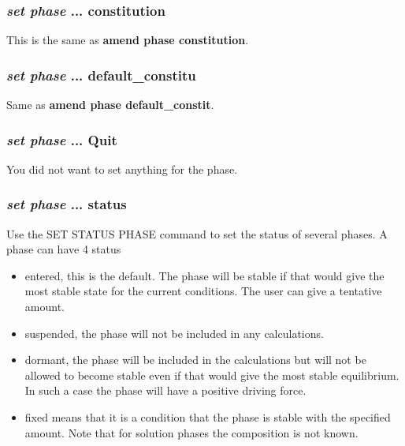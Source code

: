 \documentclass[12pt]{article}
\begin{document}
\subsubsection{{\em set phase} ... constitution}

This is the same as {\bf amend phase constitution}.

\subsubsection{{\em set phase} ... default\_constitu}

Same as {\bf amend phase default\_constit}.

\subsubsection{{\em set phase} ... Quit}

You did not want to set anything for the phase.

\subsubsection{{\em set phase} ... status}

Use the SET STATUS PHASE command to set the status of several phases.
A phase can have 4 status

\begin{itemize}
\item entered, this is the default.  The phase will be stable if that
would give the most stable state for the current conditions.  The user
can give a tentative amount.
\item suspended, the phase will not be included in any calculations.
\item dormant, the phase will be included in the calculations but will
not be allowed to become stable even if that would give the most
stable equilibrium.  In such a case the phase will have a positive
driving force.
\item fixed means that it is a condition that the phase is stable with
the specified amount.  Note that for solution phases the composition
is not known.
\end{itemize}
\end{document}
